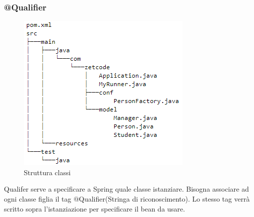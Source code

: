 \documentclass[11pt,a4paper]{book}
\begin{document}
\subsubsection{@Qualifier}\label{par: qualifier}
\begin{figure}[h!]
	\begin{center}
		\includegraphics[scale=0.6]{img/024.png}
		\caption{Struttura classi}
		\label{fig: 024}
	\end{center}
\end{figure}
Qualifer serve a specificare a Spring quale classe istanziare. Bisogna associare ad ogni classe figlia il tag $@$Qualifier(Stringa di riconoscimento). Lo stesso tag verrà scritto sopra l'istanziazione per specificare il bean da usare.
\end{document}
